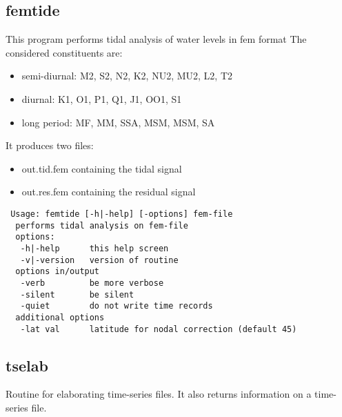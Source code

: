 \subsection{femtide}
This program performs tidal analysis of water levels in fem format
The considered constituents are: 
\begin{itemize}
\item semi-diurnal: M2, S2, N2, K2, NU2, MU2, L2, T2
\item diurnal:      K1, O1, P1, Q1, J1, OO1, S1
\item long period:  MF, MM, SSA, MSM, MSM, SA
\end{itemize}

It produces two files:
\begin{itemize}
\item out.tid.fem  containing the tidal signal
\item out.res.fem  containing the residual signal
\end{itemize}

\begin{verbatim}
 Usage: femtide [-h|-help] [-options] fem-file
  performs tidal analysis on fem-file
  options:
   -h|-help      this help screen
   -v|-version   version of routine
  options in/output
   -verb         be more verbose
   -silent       be silent
   -quiet        do not write time records
  additional options
   -lat val      latitude for nodal correction (default 45)
\end{verbatim}

\subsection{tselab}
Routine for elaborating time-series files. It also returns
information on a time-series file.

